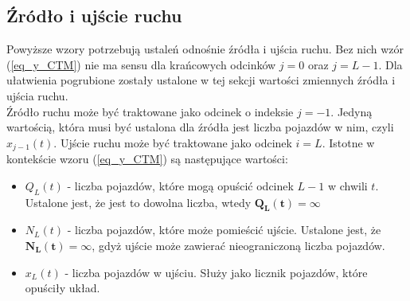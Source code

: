 \documentclass[12pt]{book}
\theoremstyle{plain}
\newcommand{\myref}[1]{(\ref{#1})}
\begin{document}
\subsection*{Źródło i ujście ruchu}
Powyższe wzory potrzebują ustaleń odnośnie źródła i ujścia ruchu. Bez nich wzór \myref{eq_y_CTM} nie ma sensu dla krańcowych odcinków $j=0$ oraz $j=L-1$. Dla ułatwienia pogrubione zostały ustalone w tej sekcji wartości zmiennych źródła i ujścia ruchu. \\ Źródło ruchu może być traktowane jako odcinek o indeksie $j=-1$. Jedyną wartością, która musi być ustalona dla źródła jest liczba pojazdów w nim, czyli $x_{j-1}(t)$. 
Ujście ruchu może być traktowane jako odcinek $i=L$. Istotne w kontekście wzoru \myref{eq_y_CTM} są następujące wartości:
\begin{itemize}
	\item $Q_{L}(t)$ - liczba pojazdów, które mogą opuścić odcinek $L-1$ w chwili $t$. Ustalone jest, że jest to dowolna liczba, wtedy $\mathbf{Q_{L}(t)=\infty}$
	\item $N_{L}(t)$ - liczba pojazdów, które może pomieścić ujście. Ustalone jest, że $\mathbf{N_{L}(t)=\infty}$, gdyż ujście może zawierać nieograniczoną liczba pojazdów.
	\item $x_{L}(t)$ - liczba pojazdów w ujściu. Służy jako licznik pojazdów, które opuściły układ.
\end{itemize}
\end{document}
